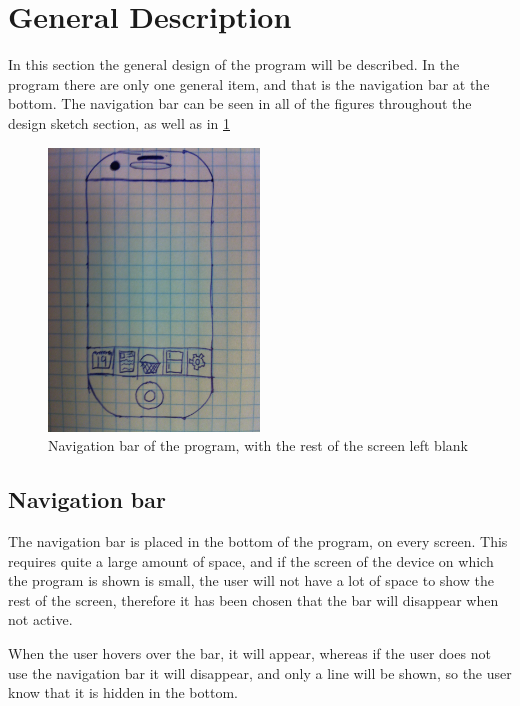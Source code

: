 \section{General Description}

In this section the general design of the program will be described. In the program there are only one general item, and that is the navigation bar at the bottom. The navigation bar can be seen in all of the figures throughout the design sketch section, as well as in \cref{NavigationBarSketch}

\begin{figure}[H]
	\centering
    \includegraphics[width=0.5\textwidth]{Grafik/FoodPlanner/NavigationBarSketch}
	\caption{Navigation bar of the program, with the rest of the screen left blank}
	\label{NavigationBarSketch}
\end{figure}

\subsection{Navigation bar}

The navigation bar is placed in the bottom of the program, on every screen. This requires quite a large amount of space, and if the screen of the device on which the program is shown is small, the user will not have a lot of space to show the rest of the screen, therefore it has been chosen that the bar will disappear when not active.

When the user hovers over the bar, it will appear, whereas if the user does not use the navigation bar it will disappear, and only a line will be shown, so the user know that it is hidden in the bottom.

